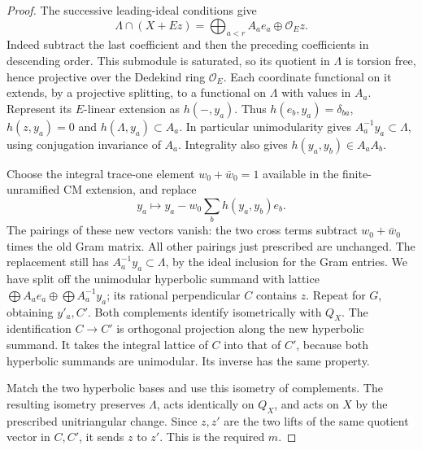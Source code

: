 \begin{proof}
The successive leading-ideal conditions give
\[
 \Lambda\cap(X+Ez)=\bigoplus_{a<r}A_ae_a\oplus\mathcal O_Ez .
\]
Indeed subtract the last coefficient and then the preceding
coefficients in descending order.  This submodule is saturated,
so its quotient in \(\Lambda\) is torsion free, hence projective
over the Dedekind ring \(\mathcal O_E\).
Each coordinate functional on it extends, by a projective splitting,
to a functional on \(\Lambda\) with values in \(A_a\).
Represent its \(E\)-linear extension as \(h(-,y_a)\).
Thus \(h(e_b,y_a)=\delta_{ba}\), \(h(z,y_a)=0\) and
\(h(\Lambda,y_a)\subset A_a\).  In particular unimodularity
gives \(A_a^{-1}y_a\subset\Lambda\), using conjugation invariance
of \(A_a\).  Integrality also gives
\(h(y_a,y_b)\in A_a A_b\).

Choose the integral trace-one element \(w_0+\bar w_0=1\)
available in the finite-unramified CM extension, and replace
\[
 y_a\longmapsto y_a-w_0\sum_b h(y_a,y_b)e_b .
\]
The pairings of these new vectors vanish: the two cross terms
subtract \(w_0+\bar w_0\) times the old Gram matrix.  All other
pairings just prescribed are unchanged.  The replacement still
has \(A_a^{-1}y_a\subset\Lambda\), by the ideal inclusion for
the Gram entries.  We have split off the unimodular hyperbolic
summand with lattice
\(\bigoplus A_ae_a\oplus\bigoplus A_a^{-1}y_a\);
its rational perpendicular \(C\) contains \(z\).
Repeat for \(G\), obtaining \(y'_a,C'\).  Both complements
identify isometrically with \(Q_X\).  The identification
\(C\to C'\) is orthogonal projection along the new hyperbolic
summand.  It takes the integral lattice of \(C\) into that of
\(C'\), because both hyperbolic summands are unimodular.
Its inverse has the same property.

Match the two hyperbolic bases and use this isometry of
complements.  The resulting isometry preserves \(\Lambda\),
acts identically on \(Q_X\), and acts on \(X\) by the prescribed
unitriangular change.  Since \(z,z'\) are the two lifts of the
same quotient vector in \(C,C'\), it sends \(z\) to \(z'\).
This is the required \(m\).
\end{proof}

